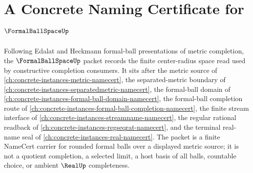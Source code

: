 \chapter{A Concrete Naming Certificate for $\FormalBallSpaceUp$}
\label{ch:concrete-instances-formal-ball-space-namecert}

Following Edalat and Heckmann formal-ball presentations of metric completion, the $\FormalBallSpaceUp$ packet records the finite center-radius space read used by constructive completion consumers. It sits after the metric source of \autoref{ch:concrete-instances-metric-namecert}, the separated-metric boundary of \autoref{ch:concrete-instances-separatedmetric-namecert}, the formal-ball domain of \autoref{ch:concrete-instances-formal-ball-domain-namecert}, the formal-ball completion route of \autoref{ch:concrete-instances-formal-ball-completion-namecert}, the finite stream interface of \autoref{ch:concrete-instances-streamname-namecert}, the regular rational readback of \autoref{ch:concrete-instances-regseqrat-namecert}, and the terminal real-name seal of \autoref{ch:concrete-instances-real-namecert}. The packet is a finite NameCert carrier for rounded formal balls over a displayed metric source; it is not a quotient completion, a selected limit, a host basis of all balls, countable choice, or ambient $\RealUp$ completeness.

